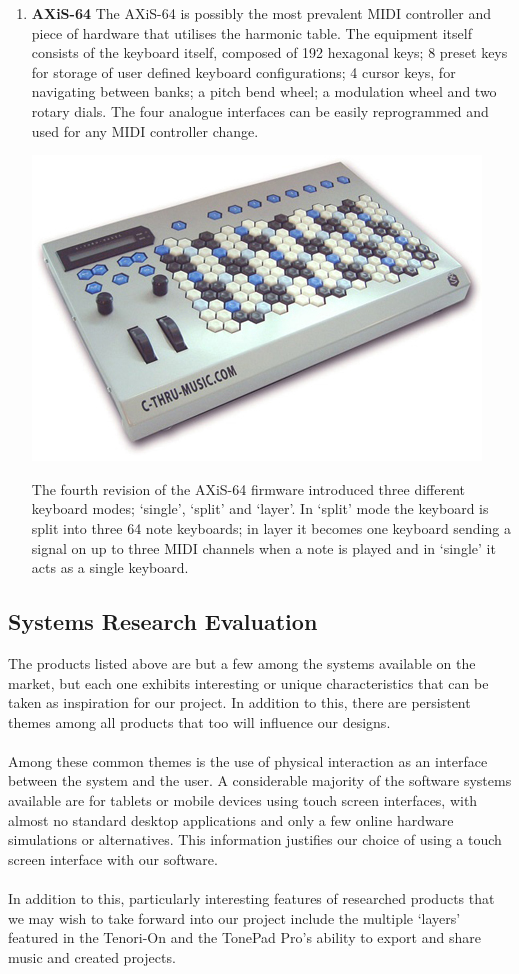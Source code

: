 \documentclass[10pt,a4paper]{article}
\begin{document}
\begin{enumerate}
\item \textbf{AXiS-64}
The AXiS-64 is possibly the most prevalent MIDI controller and piece of hardware that utilises the harmonic table. The equipment itself consists of the keyboard itself, composed of 192 hexagonal keys; 8 preset keys for storage of user defined keyboard configurations; 4 cursor keys, for navigating between banks; a pitch bend wheel; a modulation wheel and two rotary dials\cite{cthru}. The four analogue interfaces can be easily reprogrammed and used for any MIDI controller change.
\begin{center}
\includegraphics[scale=0.5]{4.jpg}
\end{center}
The fourth revision of the AXiS-64 firmware introduced three different keyboard modes; `single’, `split’ and `layer’.  In ‘split’ mode the keyboard is split into three 64 note keyboards; in layer it becomes one keyboard sending a signal on up to three MIDI channels when a note is played and in `single’ it acts as a single keyboard.
\end{enumerate}
\subsection{Systems Research Evaluation}
The products listed above are but a few among the systems available on the market, but each one exhibits interesting or unique characteristics that can be taken as inspiration for our project. In addition to this, there are persistent themes among all products that too will influence our designs.\\
\\
Among these common themes is the use of physical interaction as an interface between the system and the user. A considerable majority of the software systems available are for tablets or mobile devices using touch screen interfaces, with almost no standard desktop applications and only a few online hardware simulations or alternatives. This information justifies our choice of using a touch screen interface with our software.\\
\\
In addition to this, particularly interesting features of researched products that we may wish to take forward into our project include the multiple `layers' featured in the Tenori-On and the TonePad Pro's ability to export and share music and created projects. 
\end{document}
